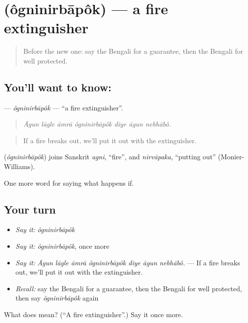 \section[\texorpdfstring{\bn{অগ্নিনির্বাপক} (ôgninirbāpôk)}{অগ্নিনির্বাপক (ôgninirbāpôk)}]{ (ôgninirbāpôk) — a fire extinguisher}

\label{lesson:BN-C535-ogninirbapok}



\begin{quote}
Before the new one: say the Bengali for a guarantee, then the Bengali for well protected.
\end{quote}

\subsection*{You'll want to know: }
\textbf{} — \emph{ôgninirbāpôk} — \textquotedblleft{}a fire extinguisher\textquotedblright{}.

\begin{quote}
      
\end{quote}

\begin{quote}
\emph{Āgun lāgle āmrā ôgninirbāpôk diye āgun nebhābô.}
\end{quote}

\begin{quote}
If a fire breaks out, we'll put it out with the extinguisher.
\end{quote}

\begin{cousinweb}
\textbf{} (\emph{ôgninirbāpôk}) joins Sanskrit \emph{agni}, \textquotedblleft{}fire\textquotedblright{}, and \emph{nirvāpaka}, \textquotedblleft{}putting out\textquotedblright{} (Monier-Williams).
\end{cousinweb}

\begin{grammarlens}[title={What you've built}]
One more word for saying what happens if.
\end{grammarlens}

\subsection*{Your turn}
\begin{itemize}
\raggedright
  \item \emph{Say it:} \emph{ôgninirbāpôk}
  \item \emph{Say it:} \emph{ôgninirbāpôk}, once more
  \item \emph{Say it:} \emph{Āgun lāgle āmrā ôgninirbāpôk diye āgun nebhābô.} — If a fire breaks out, we'll put it out with the extinguisher.
  \item \emph{Recall:} say the Bengali for a guarantee, then the Bengali for well protected, then say \emph{ôgninirbāpôk} again
\end{itemize}

\begin{tcolorbox}[breakable,colback=teal!4,colframe=teal!35!black,title={Before you move on}]
What does  mean? (\textquotedblleft{}A fire extinguisher\textquotedblright{}.) Say it once more.
\end{tcolorbox}
